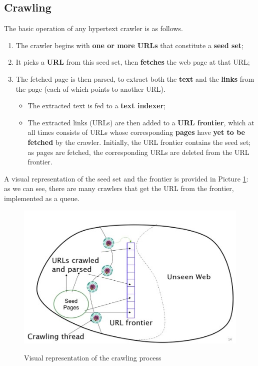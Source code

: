 \subsection{Crawling}
The basic operation of any hypertext crawler is as follows. 

\begin{enumerate}
    \item The crawler begins with \textbf{one or more URLs} that constitute a \textbf{seed set};
    \item It picks a \textbf{URL} from this seed set, then \textbf{fetches} the web page at that URL;
    \item The fetched page is then parsed, to extract both the \textbf{text} and the \textbf{links} from the page (each of which points to another URL). 
    \begin{itemize}
        \item The extracted text is fed to a \textbf{text indexer};
        \item The extracted links (URLs) are then added to a \textbf{URL frontier}, which at all times consists of URLs whose corresponding \textbf{pages} have \textbf{yet to be fetched} by the crawler. Initially, the URL frontier contains the seed set; as pages are fetched, the corresponding URLs are deleted from the URL frontier.
    \end{itemize} 
\end{enumerate}

A visual representation of the seed set and the frontier is provided in Picture \ref{crawling}: as we can see, there are many crawlers that get the URL from the frontier, implemented as a queue.

\begin{figure}[h!]
		\centering
		\includegraphics[scale = 1.6]{img/crawling.jpg}
		\label{crawling}
        \caption{Visual representation of the crawling process}
\end{figure}

